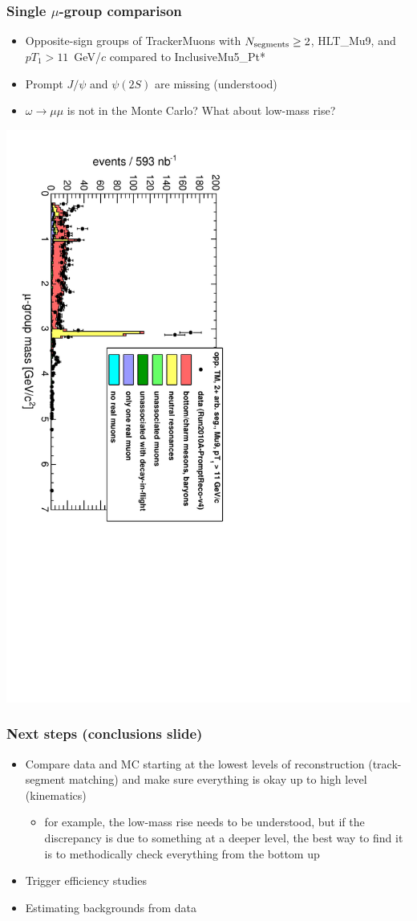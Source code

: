 \documentclass[compress]{beamer}
\newcommand{\s}[1]{{\mbox{\scriptsize #1}}}
\begin{document}
\begin{frame}
\frametitle{Single $\mu$-group comparison}

\begin{itemize}
\item Opposite-sign groups of TrackerMuons with $N_\s{segments} \ge 2$, HLT\_Mu9, and $pT_1 > 11$~GeV/$c$ compared to InclusiveMu5\_Pt*
\item Prompt $J/\psi$ and $\psi(2S)$ are missing (understood)
\item $\omega \to \mu\mu$ is not in the Monte Carlo?  What about low-mass rise?
\end{itemize}

\includegraphics[height=\linewidth, angle=90]{Mu9_mass_general.pdf}
\end{frame}

\begin{frame}
\frametitle{Next steps (conclusions slide)}
\begin{itemize}\setlength{\itemsep}{0.25 cm}
\item Compare data and MC starting at the lowest levels of
  reconstruction (track-segment matching) and make sure everything is
  okay up to high level (kinematics)
\begin{itemize}
\item for example, the low-mass rise needs to be understood, but if
  the discrepancy is due to something at a deeper level, the best way
  to find it is to methodically check everything from the bottom up
\end{itemize}

\item Trigger efficiency studies

\item Estimating backgrounds from data
\end{itemize}
\label{numpages}
\end{frame}
\end{document}
